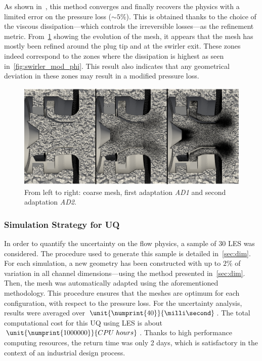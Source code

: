 As shown in~\cite{Daviller2017}, this method converges and finally recovers the physics with a limited error on the pressure loss ($\sim 5$\%). This is obtained thanks to the choice of the viscous dissipation---which controls the irreversible losses---as the refinement metric. From~\cref{fig:mesh-AD-1-2} showing the evolution of the mesh, it appears that the mesh has mostly been refined around the plug tip and at the swirler exit. These zones indeed correspond to the zones where the dissipation is highest as seen in~\cref{fig:swirler_mod_phi}. This result also indicates that any geometrical deviation in these zones may result in a modified pressure loss. %

\begin{figure}[!h]
\centering
\includegraphics[width=\linewidth,keepaspectratio]{fig/applications/swirler/mesh_init-AD_1-2.pdf}
\caption{From left to right: coarse mesh, first adaptation \emph{AD1} and second adaptation \emph{AD2}.}
\label{fig:mesh-AD-1-2}
\end{figure}


\subsubsection{Simulation Strategy for UQ}

In order to quantify the uncertainty on the flow physics, a sample of 30 LES was considered. The procedure used to generate this sample is detailed in~\cref{sec:dim}. For each simulation, a new geometry has been constructed with up to $2\%$ of variation in all channel dimensions---using the method presented in~\cref{sec:dim}. Then, the mesh was automatically adapted using the aforementioned methodology. This procedure ensures that the meshes are optimum for each configuration, with respect to the pressure loss. For the uncertainty analysis, results were averaged over $\unit{\numprint{40}}{\milli\second}$. The total computational cost for this UQ using LES is about $\unit{\numprint{1000000}}{CPU\;hours}$. Thanks to high performance computing resources, the return time was only 2 days, which is satisfactory in the context of an industrial design process.

